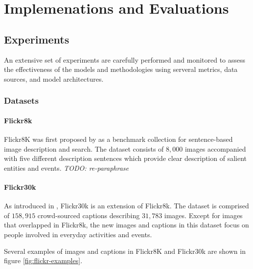 \chapter{Implemenations and Evaluations}

\section{Experiments}
An extensive set of experiments are carefully performed and monitored to assess the effectiveness of the models and methodologies using serveral metrics, data sources, and model architectures.

\subsection{Datasets}
\subsubsection{Flickr8k}
Flickr8K was first proposed by \cite{Hodosh:2013:FID:2566972.2566993} as a benchmark collection for sentence-based image description and search. The dataset consists of $8,000$ images accompanied with five different description sentences which provide clear description of salient entities and events. \textit{TODO: re-paraphrase}
\subsubsection{Flickr30k}
As introduced in \cite{DBLP:journals/tacl/YoungLHH14}, Flickr30k is an extension of Flickr8k. The dataset is comprised of $158,915$ crowd-sourced captions describing $31,783$ images. Except for images that overlapped in Flickr8k, the new images and captions in this dataset focus on people involved in everyday activities and events.

Several examples of images and captions in Flickr8K and Flickr30k are shown in figure \ref{fig:flickr-examples}.

